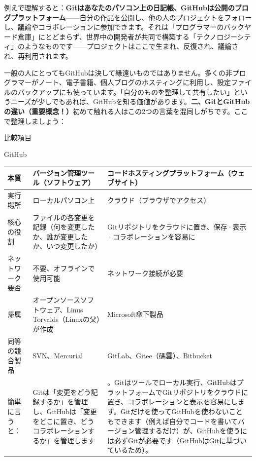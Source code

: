 


例えで理解すると：\textbf{Gitはあなたのパソコン上の日記帳、GitHubは公開のブログプラットフォーム}——自分の作品を公開し、他の人のプロジェクトをフォローし、議論やコラボレーションに参加できます。それは「プログラマーのバックヤード倉庫」にとどまらず、世界中の開発者が共同で構築する「テクノロジーシティ」のようなものです——プロジェクトはここで生まれ、反復され、議論され、再利用されます。

一般の人にとってもGitHubは決して縁遠いものではありません。多くの非プログラマーがノート、電子書籍、個人ブログのホスティングに利用し、設定ファイルのバックアップにも使っています。「自分のものを整理して共有したい」というニーズが少しでもあれば、GitHubを知る価値があります。\textbf{二、GitとGitHubの違い（重要概念！）}初めて触れる人はこの2つの言葉を混同しがちです。ここで整理しましょう：

比較項目


GitHub

\begin{center}
\begin{tabularx}{\linewidth}{|X|X|X|}
\hline
\textbf{本質} & \textbf{バージョン管理ツール（ソフトウェア）} & \textbf{コードホスティングプラットフォーム（ウェブサイト）} \tabularnewline
\hline
実行場所 & ローカルパソコン上 & クラウド（ブラウザでアクセス） \tabularnewline
核心の役割 & ファイルの各変更を記録（何を変更したか、誰が変更したか、いつ変更したか） & Gitリポジトリをクラウドに置き、保存·表示·コラボレーションを容易に \tabularnewline
ネットワーク要否 & 不要、オフラインで使用可能 & ネットワーク接続が必要 \tabularnewline
帰属 & オープンソースソフトウェア、Linus Torvalds（Linuxの父）が作成 & Microsoft傘下製品 \tabularnewline
同等の競合製品 & SVN、Mercurial & GitLab、Gitee（碼雲）、Bitbucket \tabularnewline
簡単に言うと： & Gitは「変更をどう記録するか」を管理し、GitHubは「変更をどこに置き、どうコラボレーションするか」を管理します & 。Gitはツールでローカル実行、GitHubはプラットフォームでGitリポジトリをクラウドに置き、コラボレーションと表示を容易にします。Gitだけを使ってGitHubを使わないこともできます（例えば自分でコードを書いてバージョン管理するだけ）が、GitHubを使うには必ずGitが必要です（GitHubはGitに基づいているため）。 \tabularnewline
\hline
\end{tabularx}
\end{center}

